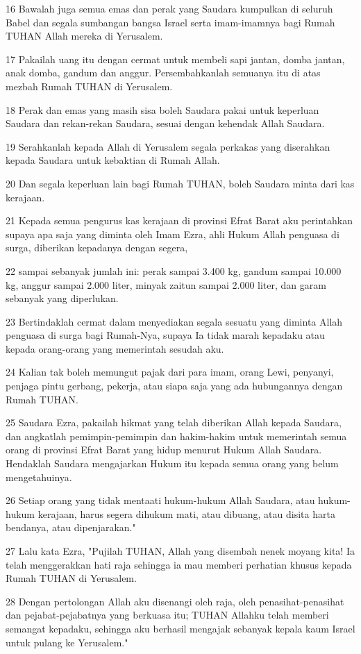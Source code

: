 \par 16 Bawalah juga semua emas dan perak yang Saudara kumpulkan di seluruh Babel dan segala sumbangan bangsa Israel serta imam-imamnya bagi Rumah TUHAN Allah mereka di Yerusalem.
\par 17 Pakailah uang itu dengan cermat untuk membeli sapi jantan, domba jantan, anak domba, gandum dan anggur. Persembahkanlah semuanya itu di atas mezbah Rumah TUHAN di Yerusalem.
\par 18 Perak dan emas yang masih sisa boleh Saudara pakai untuk keperluan Saudara dan rekan-rekan Saudara, sesuai dengan kehendak Allah Saudara.
\par 19 Serahkanlah kepada Allah di Yerusalem segala perkakas yang diserahkan kepada Saudara untuk kebaktian di Rumah Allah.
\par 20 Dan segala keperluan lain bagi Rumah TUHAN, boleh Saudara minta dari kas kerajaan.
\par 21 Kepada semua pengurus kas kerajaan di provinsi Efrat Barat aku perintahkan supaya apa saja yang diminta oleh Imam Ezra, ahli Hukum Allah penguasa di surga, diberikan kepadanya dengan segera,
\par 22 sampai sebanyak jumlah ini: perak sampai 3.400 kg, gandum sampai 10.000 kg, anggur sampai 2.000 liter, minyak zaitun sampai 2.000 liter, dan garam sebanyak yang diperlukan.
\par 23 Bertindaklah cermat dalam menyediakan segala sesuatu yang diminta Allah penguasa di surga bagi Rumah-Nya, supaya Ia tidak marah kepadaku atau kepada orang-orang yang memerintah sesudah aku.
\par 24 Kalian tak boleh memungut pajak dari para imam, orang Lewi, penyanyi, penjaga pintu gerbang, pekerja, atau siapa saja yang ada hubungannya dengan Rumah TUHAN.
\par 25 Saudara Ezra, pakailah hikmat yang telah diberikan Allah kepada Saudara, dan angkatlah pemimpin-pemimpin dan hakim-hakim untuk memerintah semua orang di provinsi Efrat Barat yang hidup menurut Hukum Allah Saudara. Hendaklah Saudara mengajarkan Hukum itu kepada semua orang yang belum mengetahuinya.
\par 26 Setiap orang yang tidak mentaati hukum-hukum Allah Saudara, atau hukum-hukum kerajaan, harus segera dihukum mati, atau dibuang, atau disita harta bendanya, atau dipenjarakan."
\par 27 Lalu kata Ezra, "Pujilah TUHAN, Allah yang disembah nenek moyang kita! Ia telah menggerakkan hati raja sehingga ia mau memberi perhatian khusus kepada Rumah TUHAN di Yerusalem.
\par 28 Dengan pertolongan Allah aku disenangi oleh raja, oleh penasihat-penasihat dan pejabat-pejabatnya yang berkuasa itu; TUHAN Allahku telah memberi semangat kepadaku, sehingga aku berhasil mengajak sebanyak kepala kaum Israel untuk pulang ke Yerusalem."

